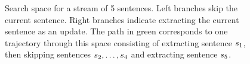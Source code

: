 \begin{figure}
{}


\caption{Search space for a stream of 5 sentences.  Left branches skip the
current sentence.  Right branches indicate extracting the current sentence as
an update.  The path in green corresponds to one trajectory through this space
consisting of extracting sentence $s_1$, then skipping sentences
$s_2,\ldots,s_4$ and extracting sentence $s_5$.}
  \label{fig:search}
\end{figure}

